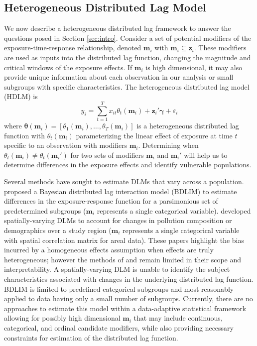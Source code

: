 \documentclass[12pt]{article}
\begin{document}
\subsection{Heterogeneous Distributed Lag Model}\label{sec:hdlm}
We now describe a heterogeneous distributed lag framework to answer the questions posed in Section \ref{sec:intro}. Consider a set of potential modifiers of the exposure-time-response relationship, denoted $\mathbf{m}_i$ with $\mathbf{m}_i\subseteq \mathbf{z}_i$. These modifiers are used as inputs into the distributed lag function, changing the magnitude and critical windows of the exposure effects. If $\mathbf{m}_i$ is high dimensional, it may also provide unique information about each observation in our analysis or small subgroups with specific characteristics. The heterogeneous distributed lag model (HDLM) is  
\begin{equation}
    \label{eq:hetergeneous_dlm}
    y_i=\sum_{t=1}^T x_{it}\theta_t(\mathbf{m}_i)+\mathbf{z}_i'\boldsymbol\gamma+\varepsilon_i
\end{equation}
where $\boldsymbol\theta(\mathbf{m}_i)=[\theta_1(\mathbf{m}_i),\ldots,\theta_T(\mathbf{m}_i)]$ is a heterogeneous distributed lag function with $\theta_t(\mathbf{m}_i)$ parameterizing the linear effect of exposure at time $t$ specific to an observation with modifiers $\mathbf{m}_i$. Determining when $\theta_t(\mathbf{m}_i)\neq \theta_t(\mathbf{m}_i')$ for two sets of modifiers $\mathbf{m}_i$ and $\mathbf{m}_i'$ will help us to determine differences in the exposure effects and identify vulnerable populations. 

Several methods have sought to estimate DLMs that vary across a population. \cite{Wilson2017a} proposed a Bayesian distributed lag interaction model (BDLIM) to estimate differences in the exposure-response function for a parsimonious set of predetermined subgroups ($\mathbf{m}_i$ represents a single categorical variable). \cite{Warren2020} developed spatially-varying DLMs to account for changes in pollution composition or demographics over a study region ($\mathbf{m}_i$ represents a single categorical variable with spatial correlation matrix for areal data). These papers highlight the bias incurred by a homogeneous effects assumption when effects are truly heterogeneous; however the methods of \cite{Wilson2017a} and \cite{Warren2020} remain limited in their scope and interpretability. A spatially-varying DLM is unable to identify the subject characteristics associated with changes in the underlying distributed lag function. BDLIM is limited to predefined categorical subgroups and most reasonably applied to data having only a small number of subgroups. Currently, there are no approaches to estimate this model within a data-adaptive statistical framework allowing for possibly high dimensional $\mathbf{m}_i$ that may include continuous, categorical, and ordinal candidate modifiers, while also providing necessary constraints for estimation of the distributed lag function.
\end{document}
